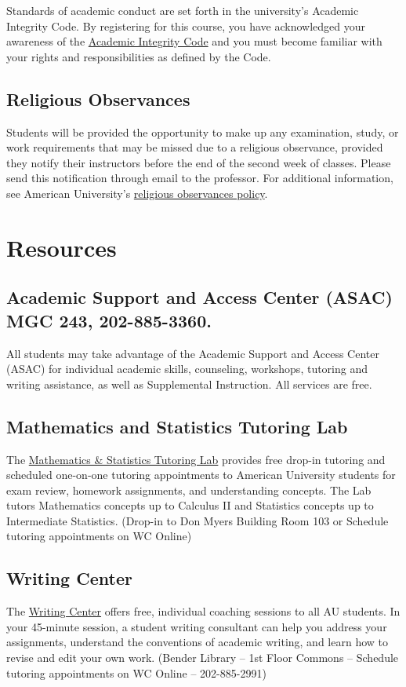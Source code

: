 \documentclass[10pt]{homework}
\begin{document}
Standards of academic conduct are set forth in the university’s Academic Integrity Code. By registering for this course, you have acknowledged your awareness of the \href{https://www.american.edu/academics/integrity/code.cfm}{Academic Integrity Code} and you must become familiar with your rights and responsibilities as defined by the Code. 

\subsection{Religious Observances}

Students will be provided the opportunity to make up any examination, study, or work requirements that may be missed due to a religious observance, provided they notify their instructors before the end of the second week of classes. Please send this notification through email to the professor. For additional information, see American University’s \href{http://www.american.edu/ocl/kay/Major-Religious-Holy-Days.cfm}{religious observances policy}.


\section{Resources}

\subsection{Academic Support and Access Center (ASAC) MGC 243,
202-885-3360.} All students may take advantage of the Academic
Support and Access Center (ASAC) for individual academic skills,
counseling, workshops, tutoring and writing assistance, as well
as Supplemental Instruction. All services are free.  

\subsection{Mathematics and Statistics Tutoring Lab} The \href{https://www.american.edu/provost/academic-access/mathstat.cfm}{Mathematics \& Statistics Tutoring Lab} provides free drop-in tutoring and scheduled one-on-one tutoring appointments to American University students for exam review, homework assignments, and understanding concepts. The Lab tutors Mathematics concepts up to Calculus II and Statistics concepts up to Intermediate Statistics. (Drop-in to Don Myers Building Room 103 or Schedule tutoring appointments on WC Online)

\subsection{Writing Center} The \href{https://www.american.edu/provost/academic-access/writing-center.cfm}{Writing Center} offers free, individual coaching sessions to all AU students. In your 45-minute session, a student writing consultant can help you address your assignments, understand the conventions of academic writing, and learn how to revise and edit your own work. (Bender Library – 1st Floor Commons – Schedule tutoring appointments on WC Online – 202-885-2991)
\end{document}
